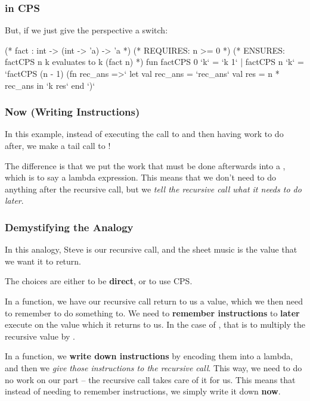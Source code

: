 \documentclass[aspectratio=169]{beamer}
\begin{document}
\begin{frame}[fragile]
  \frametitle{ in CPS}

  But, if we just give the perspective a switch:

  \vspace{\fill}

  \begin{codeblock}
    (* fact : int -> (int -> 'a) -> 'a *) 
    (* REQUIRES: n >= 0 *)
    (* ENSURES: factCPS n k evaluates to k (fact n) *)
    fun factCPS 0 `k` = `k 1`
      | factCPS n `k` = 
        `factCPS (n - 1) (fn rec_ans =>`
          let 
            val rec_ans = `rec_ans`
            val res = n * rec_ans
          in
            `k res`
          end
        `)`
  \end{codeblock}
\end{frame}

\begin{frame}[fragile]
  \frametitle{Now (Writing Instructions)}

  In this example, instead of executing the call to 
  and then having work to do after, we make a tail call to !

  The difference is that we put the work that must be done afterwards 
  into a , which is to say a lambda expression. This
  means that we don't need to do anything after the recursive call, but
  we \textit{tell the recursive call what it needs to do later}.
\end{frame}

\begin{frame}[fragile]
  \frametitle{Demystifying the Analogy}

  In this analogy, Steve is our recursive call, and the sheet music is the
  value that we want it to return.

  \vspace{\fill}

  The choices are either to be \textbf{direct}, or to use CPS.

  \vspace{\fill}

  In a  function, we have our recursive call return to us a value,
  which we then need to remember to do something to. We need to \textbf{remember
  instructions} to \textbf{later} execute on the value which it returns to us.
  In the case of , that is to multiply the recursive value by .

  \vspace{\fill}

  In a  function, we \textbf{write down instructions} by encoding them into
  a lambda, and then we \textit{give those instructions to the recursive call}.
  This way, we need to do no work on our part -- the recursive call takes care
  of it for us. This means that instead of needing to remember instructions,
  we simply write it down \textbf{now}.
\end{frame}
\end{document}
